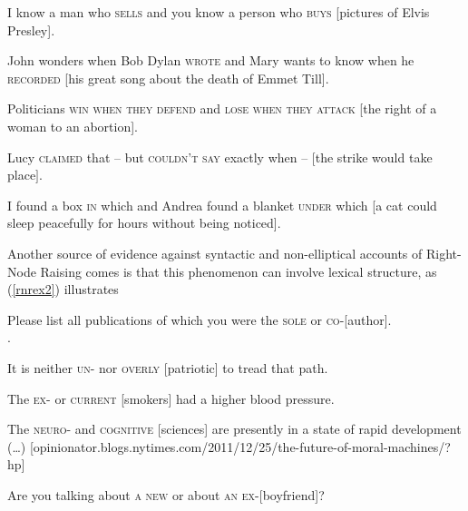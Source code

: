 \documentclass[output=paper
                ,modfonts
                ,nonflat
	        ,collection
	        ,collectionchapter
	        ,collectiontoclongg
 	        ,biblatex
                ,babelshorthands
                ,newtxmath
                ,draftmode
                ,colorlinks, citecolor=brown
]{./langsci/langscibook}
\begin{document}
\begin{exe}
\ex
\begin{xlista}
\ex  I know a man who \textsc{sells} and you know a person who \textsc{buys}
                     [pictures of Elvis Presley].

\ex John wonders when Bob Dylan
\textsc{wrote} and Mary wants to know when
  he
\textsc{recorded} [his great song about the death of Emmet Till].
 
 \ex Politicians \textsc{win when they defend} and \textsc{lose when they attack}
[the right of a woman to an abortion].

\ex Lucy \textsc{claimed} that -- but \textsc{couldn't say}
exactly when --  $[$the strike would take place$]$.
 
 \ex I found a box \textsc{in} which and Andrea found a blanket \textsc{under}
which [a cat could sleep peacefully for hours without being
noticed].
\end{xlista}\label{rnrex1}
\end{exe}

Another source of evidence against syntactic and non-elliptical accounts of Right-Node Raising comes is that this phenomenon can involve lexical structure,
as  (\ref{rnrex2}) illustrates


\begin{exe}
\ex \begin{xlista}
\ex Please list all publications of which you were the \textsc{sole} or
\textsc{co}-[author].\\
 \citep[1325, ft.\ 44]{rodney2}.
 
\ex  It is neither \textsc{un}- nor \textsc{overly} [patriotic] to tread that path.
 
\ex The \textsc{ex-} or \textsc{current} [smokers] had a higher blood pressure.\\
\citep{chaveslp} 

\ex The \textsc{neuro}- and \textsc{cognitive} [sciences] are
presently in a state of rapid development (\ldots{})
{\small [opinionator.blogs.nytimes.com/2011/12/25/the-future-of-moral-machines/?hp]}

\ex Are you talking about \textsc{a new}  or about \textsc{an ex}-[boyfriend]?

\end{xlista}\label{rnrex2}
\end{exe}
\end{document}
